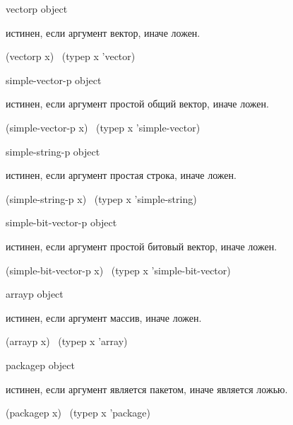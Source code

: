 \begin{defun}[Функция]
vectorp object

 истинен, если аргумент вектор, иначе ложен.
\begin{lisp}
(vectorp x) \EQ\ (typep x 'vector)
\end{lisp}
\end{defun}

\begin{defun}[Функция]
simple-vector-p object

 истинен, если аргумент простой общий вектор, иначе
ложен.
\begin{lisp}
(simple-vector-p x) \EQ\ (typep x 'simple-vector)
\end{lisp}
\end{defun}

\begin{defun}[Функция]
simple-string-p object

 истинен, если аргумент простая строка, иначе
ложен.
\begin{lisp}
(simple-string-p x) \EQ\ (typep x 'simple-string)
\end{lisp}
\end{defun}

\begin{defun}[Функция]
simple-bit-vector-p object

 истинен, если аргумент простой битовый
вектор, иначе ложен.
\begin{lisp}
(simple-bit-vector-p x) \EQ\ (typep x 'simple-bit-vector)
\end{lisp}
\end{defun}

\begin{defun}[Функция]
arrayp object

 истинен, если аргумент массив, иначе ложен.
\begin{lisp}
(arrayp x) \EQ\ (typep x 'array)
\end{lisp}
\end{defun}

\begin{defun}[Функция]
packagep object

 истинен, если аргумент является пакетом, иначе является
ложью.
\begin{lisp}
(packagep x) \EQ\ (typep x 'package)
\end{lisp}
\end{defun}

